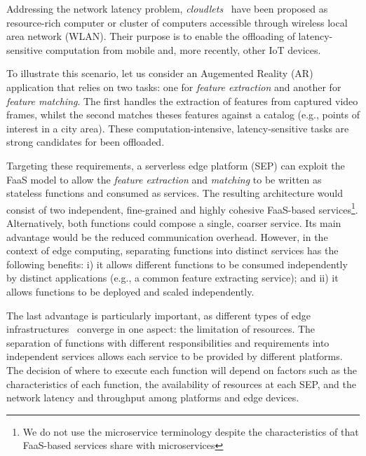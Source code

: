 \documentclass[letterpaper, 10 pt, conference]{ieeeconf}  %
\begin{document}
Addressing the network latency problem, \textit{cloudlets}~\cite{Satyanarayanan:2009} have been proposed as resource-rich computer or cluster of computers  accessible through wireless local area network (WLAN). Their purpose is to enable the offloading of latency-sensitive computation from mobile  and, more recently, other IoT devices. 


To illustrate this scenario, let us consider an Augemented Reality (AR) application that relies on two tasks: one for \textit{feature extraction} and another for \textit{feature matching}. The first handles the extraction of features from captured video frames, whilst the second matches theses features against a catalog (e.g., points of interest in a city area). 
These computation-intensive, latency-sensitive tasks are strong candidates for been offloaded.

Targeting these requirements, a serverless edge platform (SEP) can exploit the FaaS model to allow the \textit{feature extraction} and \textit{matching} to be written as stateless functions and consumed as services. The resulting architecture would consist of two independent, fine-grained and highly cohesive FaaS-based services\footnote{We do not use the microservice terminology despite the characteristics of that FaaS-based services share with microservices}. Alternatively, both functions could compose a single, coarser service. Its main advantage would be the reduced communication overhead. However, in the context of edge computing, separating functions into distinct services has the following benefits: i) it allows different functions to be consumed independently by distinct applications (e.g., a common feature extracting service); and ii) it allows functions to be deployed and scaled independently.%

The last advantage is particularly important, as different types of edge infrastructures~\cite{SURVEY_ARCH_COMM} converge in one aspect: the limitation of resources. The separation of functions with different responsibilities and requirements into independent services allows each service to be provided by different platforms. The decision of where to execute each function will depend on factors such as the characteristics of each function, the availability of resources at each SEP, and the network latency and throughput among platforms and edge devices. 
\end{document}
